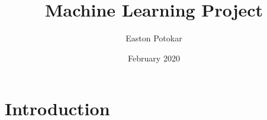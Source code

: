 \documentclass{article}
\title{Machine Learning Project}
\author{Easton Potokar}
\date{February 2020}
\begin{document}
\maketitle

\section{Introduction}
\end{document}

